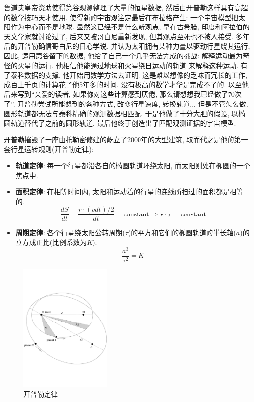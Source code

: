\documentclass[11pt,a4paper,boxed]{caspset}
\begin{document}
鲁道夫皇帝资助使得第谷观测整理了大量的恒星数据, 然后由开普勒这样具有高超的数学技巧天才使用. 使得新的宇宙观注定最后在布拉格产生: 一个宇宙模型把太阳作为中心而不是地球.
显然这已经不是什么新观点, 早在古希腊, 印度和阿拉伯的天文学家就讨论过了,
后来又被哥白尼重新发现, 但其观点至死也不被人接受. 多年后的开普勒确信哥白尼的日心学说, 并认为太阳拥有某种力量以驱动行星绕其运行,
因此, 运用第谷留下的数据, 他给了自己一个几乎无法完成的挑战: 解释运动最为奇怪的火星的运行. 他相信他能通过地球和火星绕日运动的轨道
来解释这种运动. 有了泰科数据的支撑, 他开始用数学方法去证明. 这是难以想像的乏味而冗长的工作, 成百上千页的计算花了他5年多的时间. 没有极高的数学才华是完成不了的.
以至他后来写到``亲爱的读者,
如果你对这些计算感到厌倦, 那么请想想我已经做了70次了''. 开普勒尝试所能想到的各种方式, 改变行星速度, 转换轨道... 但是不管怎么做, 圆形轨道都无法与泰科精确的观测数据相匹配. 于是他做了十分大胆的假设, 以椭圆轨道替代了之前的圆形轨道, 最后他终于创造出了匹配观测证据的宇宙模型.

开普勒摧毁了一座由托勒密修建的屹立了2000年的大型建筑, 取而代之是他的第一套行星运转规则(开普勒定律):
\begin{itemize}
\item \textbf{轨道定律}: 每一个行星都沿各自的椭圆轨道环绕太阳, 而太阳则处在椭圆的一个焦点中.
\item \textbf{面积定律}: 在相等时间内, 太阳和运动着的行星的连线所扫过的面积都是相等的.
    \[
    \frac{dS}{dt}=\frac{r\cdot (v dt)/2}{dt} = \mathrm{constant} \Longrightarrow  \mathbf{v}\cdot \mathbf{r} = \mathrm{constant}
    \]
\item \textbf{周期定律}: 各个行星绕太阳公转周期($\tau$)的平方和它们的椭圆轨道的半长轴($a$)的立方成正比(比例系数为$K$).
    \[
    \frac{a^3}{\tau^2} = K
    \]
\end{itemize}
\begin{figure}
\centering
\includegraphics[width=0.4\textwidth]{./figures/keplerLaws.pdf}
\caption{\label{keplerLaws}开普勒定律}
\end{figure}
\end{document}
